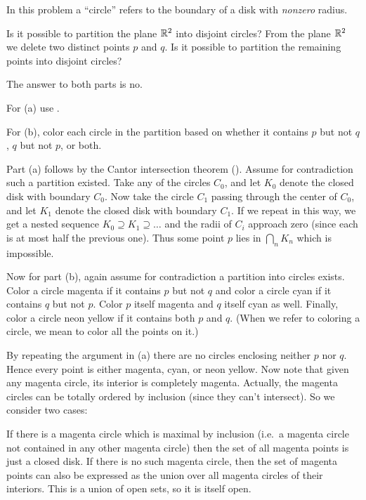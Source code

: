 \begin{problem}
	\twochili
	In this problem a ``circle''
	refers to the boundary of a disk with \emph{nonzero} radius.
	\begin{enumerate}[(a)]
		\ii Is it possible to partition the plane $\mathbb R^2$
		into disjoint circles?
		\ii From the plane $\mathbb R^2$ we delete two distinct points $p$ and $q$.
		Is it possible to partition the remaining points into disjoint circles?
	\end{enumerate}
	\begin{hint}
		The answer to both parts is no.

		For (a) use .

		For (b), color each circle in the partition
		based on whether it contains $p$ but not $q$,
		$q$ but not $p$, or both.
	\end{hint}
	\begin{sol}
		Part (a) follows by the Cantor intersection theorem
		().
		Assume for contradiction such a partition existed.
		Take any of the circles $C_0$, and let $K_0$ denote the closed disk
		with boundary $C_0$.
		Now take the circle $C_1$ passing through the center of $C_0$,
		and let $K_1$ denote the closed disk with boundary $C_1$.
		If we repeat in this way,
		we get a nested sequence $K_0 \supseteq K_1 \supseteq \dots$
		and the radii of $C_i$ approach zero
		(since each is at most half the previous one).
		Thus some point $p$ lies in $\bigcap_n K_n$ which is impossible.

		Now for part (b),
		again assume for contradiction a partition into circles exists.
		Color a circle magenta if it contains $p$ but not $q$
		and color a circle cyan if it contains $q$ but not $p$.
		Color $p$ itself magenta and $q$ itself cyan as well.
		Finally, color a circle neon yellow if it contains both $p$ and $q$.
		(When we refer to coloring a circle,
		we mean to color all the points on it.)

		By repeating the argument in (a) there are no circles
		enclosing neither $p$ nor $q$.
		Hence every point is either magenta, cyan, or neon yellow.
		Now note that given any magenta circle,
		its interior is completely magenta.
		Actually, the magenta circles can be totally ordered
		by inclusion (since they can't intersect).
		So we consider two cases:
		\begin{itemize}
		 \ii If there is a magenta circle which is maximal by inclusion
		 (i.e.\ a magenta circle not contained in any other magenta circle)
		 then the set of all magenta points is just a closed disk.
		 \ii If there is no such magenta circle,
		 then the set of magenta points can also be expressed
		 as the union over all magenta circles of their interiors.
		 This is a union of open sets, so it is itself open.
		 \end{itemize}


\end{sol}
\end{problem}
